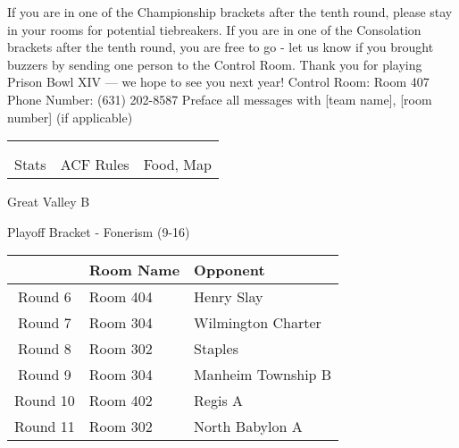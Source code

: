 \documentclass{article}%
\begin{document}
\vspace*{30pt}%
\linebreak%
If you are in one of the Championship brackets after the tenth round, please stay in your rooms for potential tiebreakers.\newline%
\newline%
If you are in one of the Consolation brackets after the tenth round, you are free to go {-} let us know if you brought buzzers by sending one person to the Control Room.\newline%
\newline%
Thank you for playing Prison Bowl XIV — we hope to see you next year!\newline%
\newline%
Control Room: Room 407\newline%
Phone Number: (631) 202{-}8587\newline%
Preface all messages with {[}team name{]}, {[}room number{]} (if applicable)%
\vspace*{30pt}%
\newline%
%
\begin{tabularx}{\textwidth}{YYY}%
  &  &  \\%
\\%
Stats&ACF Rules&Food, Map\\%
\end{tabularx}%
\newpage%
\begin{center}%
\begin{Huge}%
Great Valley B%
\end{Huge}%
\vspace*{12pt}%
\linebreak%
\begin{Large}%
Playoff Bracket {-} Fonerism (9{-}16)%
\end{Large}%
\end{center}%
\vspace*{4pt}%
%
\begin{tabularx}{\textwidth}{|c|Y|Y|}%
\hline%
&Room Name&Opponent\\%
\hline%
Round 6&Room 404&Henry Slay\\%
Round 7&Room 304&Wilmington Charter\\%
Round 8&Room 302&Staples\\%
Round 9&Room 304&Manheim Township B\\%
Round 10&Room 402&Regis A\\%
Round 11&Room 302&North Babylon A\\%
\hline%
\end{tabularx}%
\end{document}
